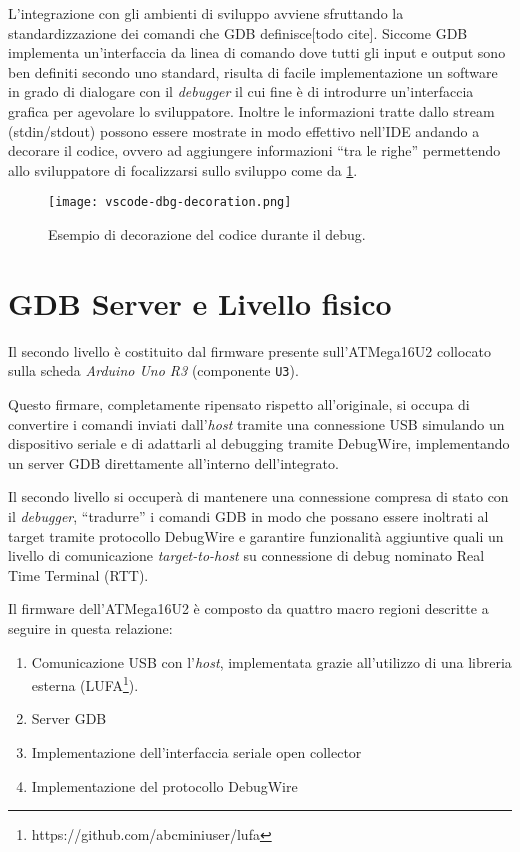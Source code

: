 L'integrazione con gli ambienti di sviluppo avviene sfruttando la standardizzazione dei comandi che GDB definisce[todo cite]. Siccome GDB implementa un'interfaccia da linea di comando dove tutti gli input e output sono ben definiti secondo uno standard, risulta di facile implementazione un software in grado di dialogare con il \textit{debugger} il cui fine è di introdurre un'interfaccia grafica per agevolare lo sviluppatore. Inoltre le informazioni tratte dallo stream (stdin/stdout) possono essere mostrate in modo effettivo nell'IDE andando a decorare il codice, ovvero ad aggiungere informazioni ``tra le righe'' permettendo allo sviluppatore di focalizzarsi sullo sviluppo come da \cref{fig:vscode-dbg-dec}.

\begin{figure}[t]
    \centering
    \texttt{[image: vscode-dbg-decoration.png]}
    \caption[]{Esempio di decorazione del codice durante il debug.}\label{fig:vscode-dbg-dec}
\end{figure}

\section{GDB Server e Livello fisico}

Il secondo livello è costituito dal firmware presente sull'ATMega16U2 collocato sulla scheda \textit{Arduino Uno R3} (componente \texttt{U3}).

Questo firmare, completamente ripensato rispetto all'originale, si occupa di convertire i comandi inviati dall'\textit{host} tramite una connessione USB simulando un dispositivo seriale e di adattarli al debugging tramite DebugWire, implementando un server GDB direttamente all'interno dell'integrato.

Il secondo livello si occuperà di mantenere una connessione compresa di stato con il \textit{debugger}, ``tradurre'' i comandi GDB in modo che possano essere inoltrati al target tramite protocollo DebugWire e garantire funzionalità aggiuntive quali un livello di comunicazione \textit{target-to-host} su connessione di debug nominato Real Time Terminal (RTT).

Il firmware dell'ATMega16U2 è composto da quattro macro regioni descritte a seguire in questa relazione:
\begin{enumerate}
    \item Comunicazione USB con l'\textit{host}, implementata grazie all'utilizzo di una libreria esterna (LUFA\footnote{https://github.com/abcminiuser/lufa}).
    \item Server GDB
    \item Implementazione dell'interfaccia seriale open collector
    \item Implementazione del protocollo DebugWire
\end{enumerate}

